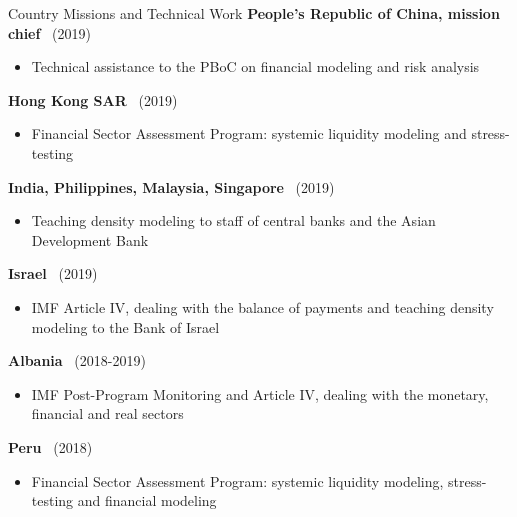 \documentclass[usegeometry, 10pt, a4paper]{cv} %
\newcommand{\activite}[1]{\textbf{#1}\ }
\newcommand{\midreduce}{-0.5cm}
\begin{document}
\begin{rubriquetableau}[0.95\textwidth]{Country Missions and Technical Work}
  \activite{People's Republic of China, mission chief} (2019)\\
  \vspace{\midreduce}
  \begin{itemize}[label={}]
    \item \small{Technical assistance to the PBoC on financial modeling and
        risk analysis}
  \end{itemize}
    
  \activite{Hong Kong SAR} (2019)\\
  \vspace{\midreduce}
  \begin{itemize}[label={}]
    \item \small{Financial Sector Assessment Program: systemic liquidity modeling and stress-testing}
  \end{itemize}

  \activite{India, Philippines, Malaysia, Singapore} (2019)\\
  \vspace{\midreduce}
  \begin{itemize}[label={}]
    \item \small{Teaching density modeling to staff of central banks and the Asian Development Bank}
  \end{itemize}

  \activite{Israel} (2019)\\
  \vspace{\midreduce}
  \begin{itemize}[label={}]
    \item \small{IMF Article IV, dealing with the balance of payments and teaching density modeling to the Bank of Israel}
  \end{itemize}

  \activite{Albania} (2018-2019)\\
  \vspace{\midreduce}
  \begin{itemize}[label={}]
    \item \small{IMF Post-Program Monitoring and Article IV, dealing with the monetary, financial and real
      sectors}
  \end{itemize}

  \activite{Peru} (2018)\\
  \vspace{\midreduce}
  \begin{itemize}[label={}]
    \item \small{Financial Sector Assessment Program: systemic liquidity modeling, stress-testing and financial modeling}
  \end{itemize}


\end{rubriquetableau}
\end{document}
